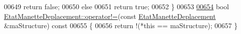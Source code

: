 \begin{DoxyCode}
00649         \textcolor{keywordflow}{return} \textcolor{keyword}{false};
00650     \textcolor{keywordflow}{else}
00651         \textcolor{keywordflow}{return} \textcolor{keyword}{true};
00652 \}
00653 
\hyperlink{struct_etat_manette_deplacement_aa57df0ecb60478f389d84c6e5d0cc1b8}{00654} \textcolor{keywordtype}{bool} \hyperlink{struct_etat_manette_deplacement_aa57df0ecb60478f389d84c6e5d0cc1b8}{EtatManetteDeplacement::operator!=}(\textcolor{keyword}{const} 
      \hyperlink{struct_etat_manette_deplacement}{EtatManetteDeplacement} &maStructure)\textcolor{keyword}{ const}
00655 \textcolor{keyword}{}\{
00656     \textcolor{keywordflow}{return} !(*\textcolor{keyword}{this} == maStructure);
00657 \}
\end{DoxyCode}
